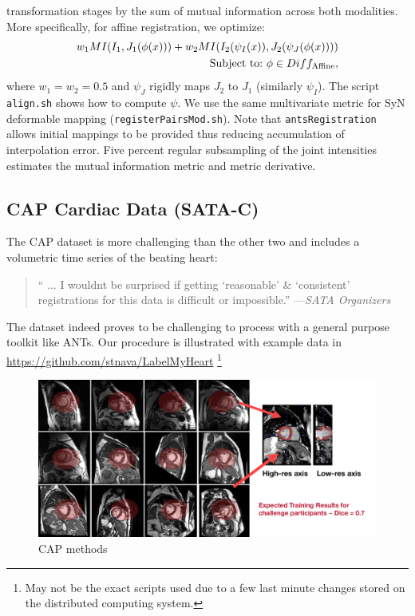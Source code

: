 \documentclass{llncs}
\begin{document}
transformation stages by the sum of mutual information across both
modalities.  More specifically, for affine registration, we optimize:
\begin{eqnarray}
w_1 MI(  I_1 , J_1( \phi(x) ) ) +
w_2 MI(  I_2(\psi_I(x)) , J_2( \psi_J(\phi(x)) ) ) \notag \\ 
\text{Subject to:}~\phi \in Diff_\text{Affine},
\end{eqnarray}
where $w_1=w_2=0.5$ and $\psi_J$ rigidly maps $J_2$ to $J_1$
(similarly $\psi_I$).  The script \texttt{align.sh} shows how to
compute $\psi$.  We use the same multivariate metric for SyN deformable mapping (\texttt{registerPairsMod.sh}).  Note that
\texttt{antsRegistration} allows initial mappings to be provided thus
reducing accumulation of interpolation error.  Five percent regular
subsampling of the joint intensities estimates the mutual information
metric and metric derivative.

\subsection{CAP Cardiac Data (SATA-C)}
The CAP dataset is more challenging than the other two and includes a volumetric time series of the beating heart:
 \begin{quote}
  `` ... I wouldnt be surprised if getting `reasonable' \& `consistent' registrations for this data is difficult or impossible.'' ---{\em SATA Organizers}
\end{quote}
\noindent The dataset indeed proves to be challenging to process with
a general purpose toolkit like ANTs.  Our procedure is illustrated
with example data in 
\url{https://github.com/stnava/LabelMyHeart} \footnote{May not be the
  exact scripts used due to a few last minute changes stored on the
  distributed computing system.}

\begin{figure}[t]
 \centering 
  \includegraphics[width=5in]{../figs/CAP_methods.pdf}
 \caption{CAP methods}
 \label{fig:CAPmethods}
\end{figure}
\end{document}
